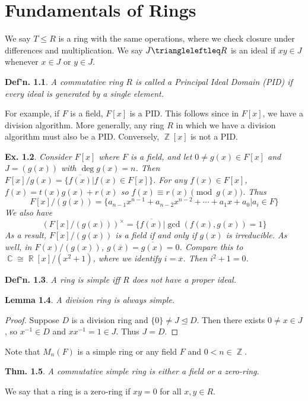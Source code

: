 \documentclass[12pt, a4paper]{book}
\DeclareMathOperator{\Z}{\mathbb{Z}}
\DeclareMathOperator{\R}{\mathbb{R}}
\DeclareMathOperator{\C}{\mathbb{C}}
\newtheorem{theorem}{Thm.}[section]
\newtheorem{lemma}[theorem]{Lemma}
\newtheorem{definition}[theorem]{Def'n.}
\newtheorem{example}[theorem]{Ex.}
\theoremstyle{nonumberplain}
\newtheorem{proof}{Proof}
\begin{document}
\chapter{Fundamentals of Rings}
We say $T\leq R$ is a ring with the same operations, where we check closure under differences and multiplication.
We say $J\triangleleftleq R$ is an ideal if $xy\in J$ whenever $x\in J$ or $y\in J$.
\begin{definition}
    A commutative ring $R$ is called a Principal Ideal Domain (PID) if every ideal is generated by a single element.
\end{definition}
For example, if $F$ is a field, $F[x]$ is a PID.
This follows since in $F[x]$, we have a division algorithm.
More generally, any ring $R$ in which we have a division algorithm must also be a PID.
Conversely, $\Z[x]$ is not a PID.
\begin{example}
    Consider $F[x]$ where $F$ is a field, and let $0\neq g(x)\in F[x]$ and $J=(g(x))$ with $\deg g(x)=n$.
    Then $F[x]/g(x)=\{\overline{f(x)}|f(x)\in F[x]\}$.
    For any $f(x)\in F[x]$, $f(x)=t(x)g(x)+r(x)$ so $f(x)\equiv r(x)\pmod{g(x)}$.
    Thus
    \[F[x]/(g(x))=\{a_{n-1}x^{n-1}+a_{n-2}x^{n-2}+\cdots+a_1x+a_0|a_i\in F\}\]
    We also have
    \[\left(F[x]/(g(x))\right)^\times = \{\overline{f(x)}|\gcd(f(x),g(x))=1\}\]
    As a result, $F[x]/(g(x))$ is a field if and only if $g(x)$ is irreducible.
    As well, in $F(x)/(g(x))$, $g(\overline{x})=\overline{g(x)}=0$.
    Compare this to $\C\cong\R[x]/(x^2+1)$, where we identify $i=\overline{x}$.
    Then $i^2+1=0$.
\end{example}
\begin{definition}
    A ring is simple iff $R$ does not have a proper ideal.
\end{definition}
\begin{lemma}
    A division ring is always simple.
\end{lemma}
\begin{proof}
    Suppose $D$ is a division ring and $\{0\}\neq J\trianglelefteq D$.
    Then there exists $0\neq x\in J$, so $x^{-1}\in D$ and $xx^{-1}=1\in J$.
    Thus $J=D$.
\end{proof}
Note that $M_n(F)$ is a simple ring or any field $F$ and $0<n\in\Z$.
\begin{theorem}
    A commutative simple ring is either a field or a zero-ring.
\end{theorem}
We say that a ring is a zero-ring if $xy=0$ for all $x,y\in R$.
\end{document}
